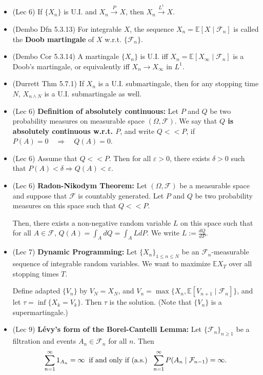 \documentclass[twoside]{article}
\newcommand{\dis}{\displaystyle}
\newcommand\bbE{\mathbb{E}}
\newcommand\calF{\mathcal{F}}
\newcommand\dlt{\delta}
\def\eps{\varepsilon}
\newcommand\Om{\Omega}
\newcommand\goesto{\rightarrow}
\begin{document}
\begin{itemize}
\item (Lec 6) If $\{X_n \}$ is U.I. and $X_n \stackrel{P}{\rightarrow} X$, then $X_n \stackrel{L^1}{\rightarrow} X$.

\item (Dembo Dfn 5.3.13) For integrable $X$, the sequence $X_n = \bbE [X \mid \calF_n]$ is called the \textbf{Doob martingale} of $X$ w.r.t. $\{\calF_n \}$.

\item (Dembo Cor 5.3.14) A martingale $\{X_n\}$ is U.I. iff $X_n = \bbE [X_\infty \mid \calF_n]$ is a Doob's martingale, or equivalently iff $X_n \goesto X_\infty$ in $L^1$.

\item (Durrett Thm 5.7.1) If $X_n$ is a U.I. submartingale, then for any stopping time $N$, $X_{n \wedge N}$ is a U.I. submartingale as well.



\item (Lec 6) \textbf{Definition of absolutely continuous:} Let $P$ and $Q$ be two probability measures on measurable space $(\Om, \calF)$. We say that \textbf{$Q$ is absolutely continuous w.r.t. $P$}, and write $Q << P$, if $P(A) = 0 \quad \Rightarrow \quad Q(A) = 0$.

\item (Lec 6) Assume that $Q << P$. Then for all $\eps > 0$, there exists $\dlt > 0$ such that $P(A) < \dlt \Rightarrow Q(A) < \eps$.

\item (Lec 6) \textbf{Radon-Nikodym Theorem:} Let $(\Om, \calF)$ be a measurable space and suppose that $\calF$ is countably generated. Let $P$ and $Q$ be two probability measures on this space such that $Q << P$.

Then, there exists a non-negative random variable $L$ on this space such that for all $A \in \calF$, $Q(A) = \dis\int_A dQ = \dis\int_A L dP$. We write $L := \dis\frac{dQ}{dP}$.

\item (Lec 7) \textbf{Dynamic Programming:} Let $\{ X_n\}_{1 \leq n \leq N}$ be an $\calF_n$-measurable sequence of integrable random variables. We want to maximize $\bbE X_T$ over all stopping times $T$.

Define adapted $\{ V_n \}$ by $V_N = X_N$, and $V_n = \max \{  X_n, \bbE[V_{n+1} \mid \calF_n] \}$, and let $\tau = \inf \{ X_k = V_k\}$. Then $\tau$ is the solution. (Note that $\{V_n\}$ is a supermartingale.)

\item (Lec 9) \textbf{L\'{e}vy's form of the Borel-Cantelli Lemma:} Let $\{ \calF_n\}_{n \geq 1}$ be a filtration and events $A_n \in \calF_n$ for all $n$. Then 
\[ \sum_{n = 1}^\infty 1_{A_n} = \infty \text{\: if and only if (a.s.) \:} \sum_{n = 1}^\infty P (A_n \mid \calF_{n-1}) = \infty. \]


\end{itemize}
\end{document}
